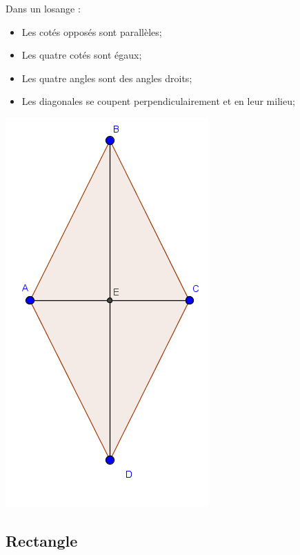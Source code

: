 \documentclass[12pt,a4paper]{article}
\begin{document}
\begin{myprops}
	
	\begin{multicols}{2}
		
		Dans un losange :
		\begin{itemize}
			\item Les cotés opposés sont parallèles;
			\item Les quatre cotés sont égaux;
			\item Les quatre angles sont des angles droits;
			\item Les diagonales se coupent perpendiculairement et en leur milieu;			
		\end{itemize}
		
			
		\includegraphics[scale=0.5]{./img/losa}
	\end{multicols}
			
	\end{myprops}


\subsection{Rectangle}
\end{document}
